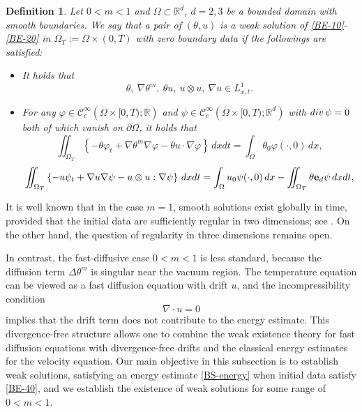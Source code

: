\documentclass{amsart}
\newtheorem{defn}{Definition}[section]
\numberwithin{equation}{section}
\newcommand{\R}{{ \mathbb{R}  }}
\begin{document}
\begin{defn}\label{Weak-ks} Let $0<m<1$ and $\Omega\subset\R^d$, $d=2,3$ be a bounded domain with smooth boundaries. We say that a pair of $(\theta, u)$ is a  weak solution of \eqref{BE-10}-\eqref{BE-20} in $\Omega_{T} := \Omega \times (0, T)$ with zero boundary data if the followings are satisfied:
\begin{itemize}
	\item [(i)] It holds that 
	\[
	\theta , \ \nabla \theta^m, \ \theta u , \ u\otimes u, \ \nabla u \in L_{x,t}^{1}.
	\]
	
	\item [(ii)] For any $\varphi \in \mathcal{C}_{c}^{\infty} \left(\overline{\Omega} \times [0, T);\R\right)$ and $\psi \in \mathcal{C}_{c}^{\infty} \left(\overline{\Omega} \times [0, T);\R^d\right)$ with $\rm{div}\,\psi=0$ both of which vanish on $\partial\Omega$, it holds that 
	\[
	\iint_{\Omega_{T}} \left\{ - \theta \varphi_t + \nabla \theta^m \nabla \varphi - \theta u\cdot \nabla \varphi \right\} \,dxdt = \int_{\Omega}\theta_0 \varphi(\cdot,0) \,dx,
	\]
	\[
	\iint_{\Omega_{T}} \left\{ - u \psi_t + \nabla u \nabla \psi - u\otimes u:\nabla \psi \right\} \,dxdt = \int_{\Omega}u_0 \psi(\cdot,0) \,dx-\iint_{\Omega_{T}}  \theta {\bf e}_d  \psi \,dxdt,
	\]
\end{itemize}	
\end{defn}

It is well known that in the case \( m = 1 \), smooth solutions exist globally in time, provided that the initial data are sufficiently regular in two dimensions; see \cite{Cannon_DiBenedetto}. On the other hand, the question of regularity in three dimensions remains open.


 In contrast, the fast-diffusive case \(0<m<1\) is less standard,
because the diffusion term \(\Delta\theta^m\) is singular near the vacuum
region. The temperature equation can be viewed as a fast diffusion equation
with drift \(u\), and the incompressibility condition
\[
\nabla\cdot u=0
\]
implies that the drift term does not contribute to the energy estimate.
This divergence-free structure allows one to combine the weak existence theory
for fast diffusion equations with divergence-free drifts and the classical
energy estimates for the velocity equation.
Our main objective in this subsection  is to establish weak solutions, satisfying an energy estimate \eqref{BS-energy} when initial data satisfy \eqref{BE-40}, and we establish the existence of weak solutions for some range of $0<m<1$.
\end{document}
